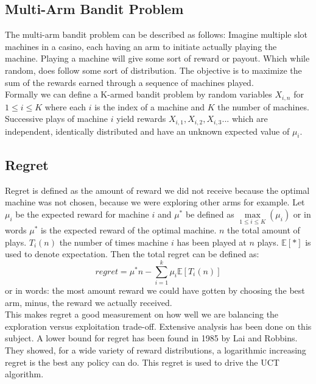 \documentclass[
11pt, %
english, %
singlespacing, %
headsepline, %
]{MastersDoctoralThesis} %
\newcommand\IE{\mathbb{E}}
\begin{document}
\subsection{Multi-Arm Bandit Problem}
The multi-arm bandit problem can be described as follows: Imagine multiple slot machines in a casino, each having an arm to initiate actually playing the machine. Playing a machine will give some sort of reward or payout. Which while random, does follow some sort of distribution. The objective is to maximize the sum of the rewards earned through a sequence of machines played.\\

Formally we can define a K-armed bandit problem by random variables $X_{i,n}$ for $1 \leq i \leq K$ where each $i$ is the index of a machine and $K$ the number of machines. Successive plays of machine $i$ yield rewards $X_{i,1},X_{i,2},X_{i,3}...$ which are independent, identically distributed and have an unknown expected value of $\mu_i$.

\subsection{Regret}
Regret is defined as the amount of reward we did not receive because the optimal machine was not chosen, because we were exploring other arms for example. Let $\mu_i$ be the expected reward for machine $i$ and $\mu^{*}$ be defined as $\max\limits_{1 \leq i \leq K} (\mu_i)$ or in words $\mu^{*}$ is the expected reward of the optimal machine. $n$ the total amount of plays. $T_i(n)$ the number of times machine $i$ has been played at $n$ plays. $\IE[*]$ is used to denote expectation. Then the total regret can be defined as:
\[
    regret = \mu^*n - \sum_{i=1}^{k}\mu_i\IE[T_i(n)]
\]
or in words: the most amount reward we could have gotten by choosing the best arm, minus, the reward we actually received.\\

This makes regret a good measurement on how well we are balancing the exploration versus exploitation trade-off. Extensive analysis has been done on this subject. A lower bound for regret has been found in 1985 by Lai and Robbins\cite{Lai+Robbins:1985}. They showed, for a wide variety of reward distributions, a logarithmic increasing regret is the best any policy can do. This regret is used to drive the UCT algorithm.
\end{document}
